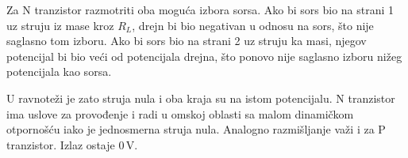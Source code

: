 Za N tranzistor razmotriti oba moguća izbora sorsa. Ako bi sors bio na strani 1 uz struju iz mase kroz $R_L$, drejn bi bio negativan u odnosu na sors, što nije saglasno tom izboru. Ako bi sors bio na strani 2 uz struju ka masi, njegov potencijal bi bio veći od potencijala drejna, što ponovo nije saglasno izboru nižeg potencijala kao sorsa.

U ravnoteži je zato struja nula i oba kraja su na istom potencijalu. N tranzistor ima uslove za provođenje i radi u omskoj oblasti sa malom dinamičkom otpornošću iako je jednosmerna struja nula. Analogno razmišljanje važi i za P tranzistor. Izlaz ostaje $0\,\mathrm V$.
